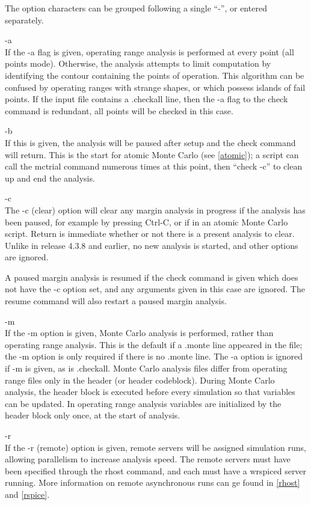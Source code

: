 The option characters can be grouped following a single ``{\vt -}'',
or entered separately.

\begin{description}
\item{\vt -a}\\
If the {\vt -a} flag is given, operating range analysis is performed
at every point (all points mode).  Otherwise, the analysis attempts to
limit computation by identifying the contour containing the points of
operation.  This algorithm can be confused by operating ranges with
strange shapes, or which possess islands of fail points.  If the input
file contains a {\vt .checkall} line, then the {\vt -a} flag to the
{\cb check} command is redundant, all points will be checked in this
case.

\item{\vt -b}\\
If this is given, the analysis will be paused after setup and the {\cb
check} command will return.  This is the start for atomic Monte Carlo
(see \ref{atomic}); a script can call the {\cb mctrial} command
numerous times at this point, then ``{\vt check -c}'' to clean up and
end the analysis.

\item{\vt -c}\\
The {\vt -c} (clear) option will clear any margin analysis in progress
if the analysis has been paused, for example by pressing {\kb Ctrl-C},
or if in an atomic Monte Carlo script.  Return is immediate whether or
not there is a present analysis to clear.  Unlike in release 4.3.8 and
earlier, no new analysis is started, and other options are ignored.

A paused margin analysis is resumed if the {\cb check} command is
given which does not have the {\vt -c} option set, and any arguments
given in this case are ignored.  The {\cb resume} command will also
restart a paused margin analysis.

\item{\vt -m}\\
If the {\vt -m} option is given, Monte Carlo analysis is performed,
rather than operating range analysis.  This is the default if a {\vt
.monte} line appeared in the file; the {\vt -m} option is only
required if there is no {\vt .monte} line.  The {\vt -a} option is
ignored if {\vt -m} is given, as is {\vt .checkall}.  Monte Carlo
analysis files differ from operating range files only in the header
(or header codeblock).  During Monte Carlo analysis, the header block
is executed before every simulation so that variables can be updated. 
In operating range analysis variables are initialized by the header
block only once, at the start of analysis.

\item{\vt -r}\\
If the {\vt -r} (remote) option is given, remote servers will be
assigned simulation runs, allowing parallelism to increase analysis
speed.  The remote servers must have been specified through the {\cb
rhost} command, and each must have a {\vt wrspiced} server running. 
More information on remote asynchronous runs can ge found in
\ref{rhost} and \ref{rspice}.
\end{description}

